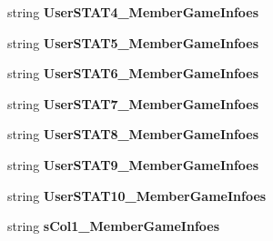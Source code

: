 \begin{DoxyCompactItemize}
\item 
string {\bfseries User\+S\+T\+A\+T4\+\_\+\+Member\+Game\+Infoes}\hypertarget{a00113_a688ee52c5870aff52a1ce82fa9f4d87c}{}\label{a00113_a688ee52c5870aff52a1ce82fa9f4d87c}

\item 
string {\bfseries User\+S\+T\+A\+T5\+\_\+\+Member\+Game\+Infoes}\hypertarget{a00113_a33566c42eea94e636aaaf03e2284a842}{}\label{a00113_a33566c42eea94e636aaaf03e2284a842}

\item 
string {\bfseries User\+S\+T\+A\+T6\+\_\+\+Member\+Game\+Infoes}\hypertarget{a00113_af6d7c200a91243a6e57017857c363bc0}{}\label{a00113_af6d7c200a91243a6e57017857c363bc0}

\item 
string {\bfseries User\+S\+T\+A\+T7\+\_\+\+Member\+Game\+Infoes}\hypertarget{a00113_a0e5188b0793b94eb2637290cdb5e80b4}{}\label{a00113_a0e5188b0793b94eb2637290cdb5e80b4}

\item 
string {\bfseries User\+S\+T\+A\+T8\+\_\+\+Member\+Game\+Infoes}\hypertarget{a00113_a8e88437c7ec0fc09aab1f20aa4b76268}{}\label{a00113_a8e88437c7ec0fc09aab1f20aa4b76268}

\item 
string {\bfseries User\+S\+T\+A\+T9\+\_\+\+Member\+Game\+Infoes}\hypertarget{a00113_a619b96fc74448157d9212e122c8b88fd}{}\label{a00113_a619b96fc74448157d9212e122c8b88fd}

\item 
string {\bfseries User\+S\+T\+A\+T10\+\_\+\+Member\+Game\+Infoes}\hypertarget{a00113_a8e80624a4807bfbe8ba40023fbb859d0}{}\label{a00113_a8e80624a4807bfbe8ba40023fbb859d0}

\item 
string {\bfseries s\+Col1\+\_\+\+Member\+Game\+Infoes}\hypertarget{a00113_a5cc3b9b9160a131632ed3cba4b65e233}{}\label{a00113_a5cc3b9b9160a131632ed3cba4b65e233}


\end{DoxyCompactItemize}
